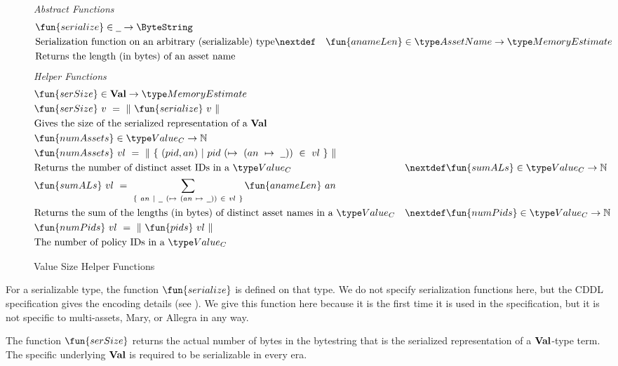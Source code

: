 \begin{figure*}[h]
  \emph{Abstract Functions}
  \begin{align*}
    & \fun{serialize} \in \wcard \to \ByteString \\
    & \text{Serialization function on an arbitrary (serializable) type}
    \nextdef
    & \fun{anameLen} \in \AssetName \to \MemoryEstimate \\
    & \text{Returns the length (in bytes) of an asset name}
  \end{align*}
  \emph{Helper Functions}
  \begin{align*}
    & \fun{serSize} \in \ValMonoid \to \MemoryEstimate \\
    & \fun{serSize}~v~=~\|~\fun{serialize}~{v}~\| \\
    & \text{Gives the size of the serialized representation of a $\ValMonoid$} \\
    & \fun{numAssets} \in \Value_C \to \N \\
    & \fun{numAssets}~{vl}~=~\|~\{~(pid, an)~\vert~pid~(\mapsto~(an~\mapsto~\wcard))~\in~vl~\}~\| \\
    & \text{Returns the number of distinct asset IDs in a $\Value_C$}
    & \nextdef
    & \fun{sumALs} \in \Value_C \to \N \\
    & \fun{sumALs}~{vl}~=~ \sum_{\{~an~\vert~\wcard~(\mapsto~(an~\mapsto~\wcard))~\in~vl~\}} \fun{anameLen}~an \\
    & \text{Returns the sum of the lengths (in bytes) of distinct asset names in a $\Value_C$}
    & \nextdef
    & \fun{numPids} \in \Value_C \to \N \\
    & \fun{numPids}~{vl} ~=~ \|~\fun{pids}~{vl}~\| \\
    & \text{The number of policy IDs in a $\Value_C$}
  \end{align*}
  \caption{Value Size Helper Functions}
  \label{fig:size-helper}
\end{figure*}

For a serializable type, the function $\fun{serialize}$ is defined on that type. We do not
specify serialization functions here, but the CDDL specification gives the encoding
details (see \cite{alonzoCDDL}). We give this function here because it is the
first time it is used in the specification, but it is not specific to
multi-assets, Mary, or Allegra in any way.

The function $\fun{serSize}$ returns the actual number of bytes in the bytestring that is the
    serialized representation of a $\mathbf{Val}$-type term. The specific underlying $\mathbf{Val}$
    is required to be serializable in every era.

